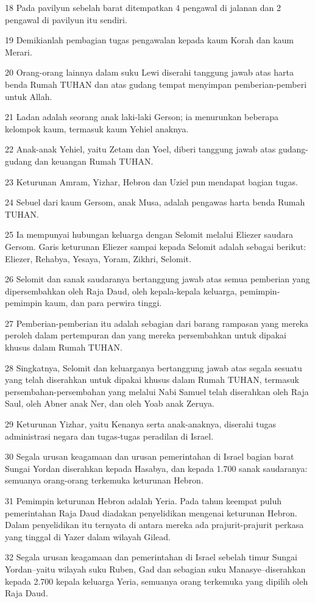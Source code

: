 \par 18 Pada pavilyun sebelah barat ditempatkan 4 pengawal di jalanan dan 2 pengawal di pavilyun itu sendiri.
\par 19 Demikianlah pembagian tugas pengawalan kepada kaum Korah dan kaum Merari.
\par 20 Orang-orang lainnya dalam suku Lewi diserahi tanggung jawab atas harta benda Rumah TUHAN dan atas gudang tempat menyimpan pemberian-pemberi untuk Allah.
\par 21 Ladan adalah seorang anak laki-laki Gerson; ia menurunkan beberapa kelompok kaum, termasuk kaum Yehiel anaknya.
\par 22 Anak-anak Yehiel, yaitu Zetam dan Yoel, diberi tanggung jawab atas gudang-gudang dan keuangan Rumah TUHAN.
\par 23 Keturunan Amram, Yizhar, Hebron dan Uziel pun mendapat bagian tugas.
\par 24 Sebuel dari kaum Gersom, anak Musa, adalah pengawas harta benda Rumah TUHAN.
\par 25 Ia mempunyai hubungan keluarga dengan Selomit melalui Eliezer saudara Gersom. Garis keturunan Eliezer sampai kepada Selomit adalah sebagai berikut: Eliezer, Rehabya, Yesaya, Yoram, Zikhri, Selomit.
\par 26 Selomit dan sanak saudaranya bertanggung jawab atas semua pemberian yang dipersembahkan oleh Raja Daud, oleh kepala-kepala keluarga, pemimpin-pemimpin kaum, dan para perwira tinggi.
\par 27 Pemberian-pemberian itu adalah sebagian dari barang rampasan yang mereka peroleh dalam pertempuran dan yang mereka persembahkan untuk dipakai khusus dalam Rumah TUHAN.
\par 28 Singkatnya, Selomit dan keluarganya bertanggung jawab atas segala sesuatu yang telah diserahkan untuk dipakai khusus dalam Rumah TUHAN, termasuk persembahan-persembahan yang melalui Nabi Samuel telah diserahkan oleh Raja Saul, oleh Abner anak Ner, dan oleh Yoab anak Zeruya.
\par 29 Keturunan Yizhar, yaitu Kenanya serta anak-anaknya, diserahi tugas administrasi negara dan tugas-tugas peradilan di Israel.
\par 30 Segala urusan keagamaan dan urusan pemerintahan di Israel bagian barat Sungai Yordan diserahkan kepada Hasabya, dan kepada 1.700 sanak saudaranya: semuanya orang-orang terkemuka keturunan Hebron.
\par 31 Pemimpin keturunan Hebron adalah Yeria. Pada tahun keempat puluh pemerintahan Raja Daud diadakan penyelidikan mengenai keturunan Hebron. Dalam penyelidikan itu ternyata di antara mereka ada prajurit-prajurit perkasa yang tinggal di Yazer dalam wilayah Gilead.
\par 32 Segala urusan keagamaan dan pemerintahan di Israel sebelah timur Sungai Yordan--yaitu wilayah suku Ruben, Gad dan sebagian suku Manasye--diserahkan kepada 2.700 kepala keluarga Yeria, semuanya orang terkemuka yang dipilih oleh Raja Daud.

